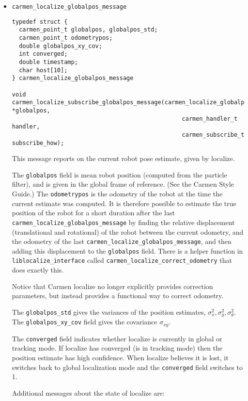 \documentclass{article}
\begin{document}
\begin{itemize}

\item \verb!carmen_localize_globalpos_message!

\begin{verbatim}
typedef struct {
  carmen_point_t globalpos, globalpos_std;
  carmen_point_t odometrypos;
  double globalpos_xy_cov;
  int converged;
  double timestamp;
  char host[10];
} carmen_localize_globalpos_message

void carmen_localize_subscribe_globalpos_message(carmen_localize_globalpos_message *globalpos,
                                                 carmen_handler_t handler,
                                                 carmen_subscribe_t subscribe_how);
\end{verbatim}

This message reports on the current robot pose estimate, given by localize.

The \verb!globalpos! field is mean robot position (computed from the particle
filter), and is given in the global frame of reference. (See the Carmen Style
Guide.) The \verb!odometrypos! is the odometry of the robot at the time the
current estimate was computed. It is therefore possible to estimate the true
position of the robot for a short duration after the last
\verb!carmen_localize_globalpos_message! by finding the relative displacement
(translational and rotational) of the robot between the current odometry, and
the odometry of the last \verb!carmen_localize_globalpos_message!, and then
adding this displacement to the \verb!globalpos! field. There is a helper
function in \verb!liblocalize_interface! called
\verb!carmen_localize_correct_odometry! that does exactly this. 

Notice that Carmen localize no longer explicitly provides correction
parameters, but instead provides a functional way to correct odometry. 

The \verb!globalpos_std! gives the variances of the position estimates,
$\sigma_x^2, \sigma_y^2, \sigma_\theta^2$. The \verb!globalpos_xy_cov! field
gives the covariance $\sigma_{xy}$. 

The \verb!converged! field indicates whether localize is currently in global
or tracking mode. If localize has converged (is in tracking mode) then the
position estimate has high confidence. When localize believes it is lost, it
switches back to global localization mode and the \verb!converged! field
switches to 1. 

Additional messages about the state of localize are:


\end{itemize}
\end{document}
